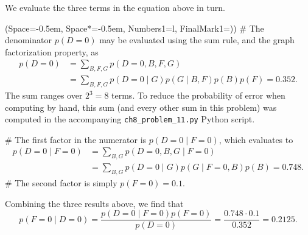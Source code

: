 \documentclass[12pt, a4paper]{article}
\newcommand{\listSpace}{-0.5em}%
\begin{document}
We evaluate the three terms in the equation above in turn.
\begin{easylist}[enumerate]
	\ListProperties(Space=\listSpace, Space*=\listSpace, Numbers1=l, FinalMark1={)})
	# The denominator $p( D = 0)$ may be evaluated using the sum rule, and the graph factorization property, as
	\begin{align*}
		p( D = 0) &= \sum_{B, F, G} p( D = 0, B, F, G) \\
		&= \sum_{B, F, G} p( D = 0 \mid G) p( G \mid B, F) p(B) p (F)
		= 0.352.
	\end{align*}
	The sum ranges over $2^3 = 8$ terms.
	To reduce the probability of error when computing by hand, this sum (and every other sum in this problem) was computed in the accompanying \texttt{ch8\_problem\_11.py} Python script.
	
	# The first factor in the numerator is $p(D = 0 \mid F =0)$, which evaluates to
	\begin{align*}
		p(D = 0 \mid F =0) &= \sum_{B, G} p(D=0, B, G \mid F = 0) \\
		&= \sum_{B, G} p(D = 0 \mid G) p(G \mid F =0, B) p(B)
		= 0.748.
	\end{align*}
	# The second factor is simply $p(F=0) = 0.1$.
\end{easylist}
Combining the three results above, we find that
\begin{equation*}
p(F=0 \mid D = 0) = \frac{p(D = 0 \mid F =0) p(F=0)}{p( D = 0)}
=
\frac{0.748 \cdot 0.1}{0.352} = 0.2125.
\end{equation*}
\end{document}
